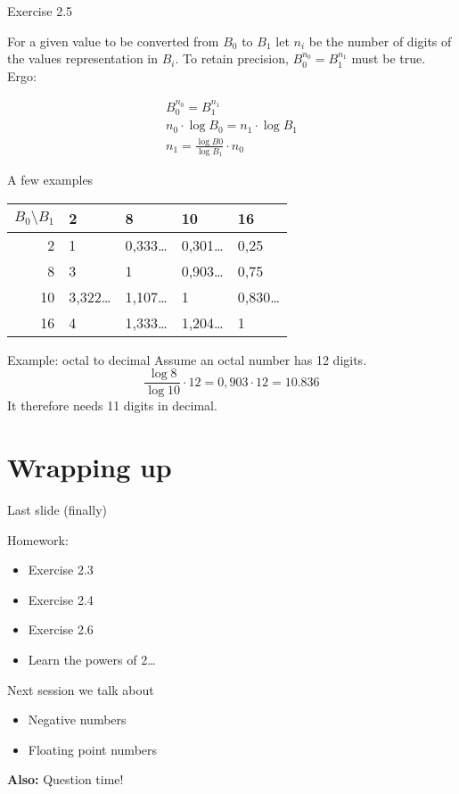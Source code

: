 \documentclass[11pt]{tudbeamer}
\begin{document}
\begin{frame}[allowframebreaks]{Exercise 2.5}

	For a given value to be converted from $B_0$ to $B_1$
	let $n_i$ be the number of digits of the values representation in $B_i$.
	To retain precision, $B^{n_0}_0 = B^{n_1}_1$ must be true. Ergo:
	
	\begin{align}
		B^{n_0}_0 = B^{n_1}_1 \\
		n_0 \cdot \log B_0 = n_1 \cdot \log B_1 \\
		n_1 = \frac{\log B0}{\log B_1} \cdot n_0
	\end{align}

\framebreak

	\centering
	A few examples
	\vspace{1em}
	
	\begin{tabular}{r|llll}
		$B_0 \setminus B_1$ & 2 & 8 & 10 & 16 \\
		\hline
		2 	& 1 			& 0,333\dots	& 0,301\dots	& 0,25 \\
		8	& 3			& 1			& 0,903\dots	& 0,75 \\
		10	& 3,322\dots	& 1,107\dots	& 1			& 0,830\dots \\
		16	& 4			& 1,333\dots	& 1,204\dots	& 1 \\
	\end{tabular}

\framebreak
	
	\begin{block}{Example: octal to decimal}
		Assume an octal number has 12 digits.
		$$\frac{\log 8}{\log 10} \cdot 12 = 0,903 \cdot 12 = 10.836$$
		It therefore needs 11 digits in decimal.
	\end{block}

\end{frame}

\section{Wrapping up}

\begin{frame}{Last slide (finally)}

	Homework:
	\begin{itemize}
		\item Exercise 2.3
		\item Exercise 2.4
		\item Exercise 2.6
		\item Learn the powers of 2\dots
	\end{itemize}
	\vspace{1em}
	
	Next session we talk about
	\begin{itemize}
		\item Negative numbers
		\item Floating point numbers
	\end{itemize} 
	\vspace{1em}
	\textbf{Also:} Question time!

\end{frame}
\end{document}
